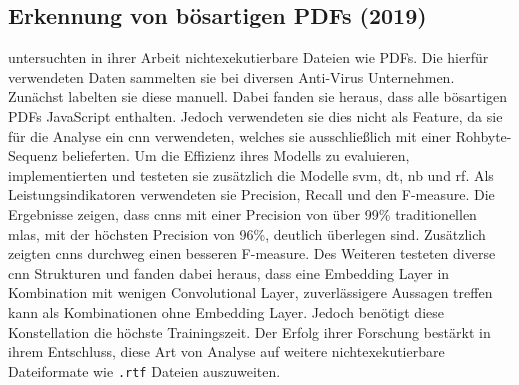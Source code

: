 \documentclass[
    12pt, %
    DIV10,
    ngerman, %
    a4paper, %
    oneside, %
    titlepage, %
    parskip=half, %
    headings=normal, %
    listof=totoc, %
    bibliography=totoc, %
    index=totoc, %
    captions=tableheading, %
    final %
]{scrreprt}
\begin{document}
\subsection{Erkennung von bösartigen PDFs (2019)}
\textcite{Jeong2019} untersuchten in ihrer Arbeit nichtexekutierbare Dateien wie PDFs. Die hierfür verwendeten Daten sammelten sie bei diversen Anti-Virus Unternehmen. Zunächst labelten sie diese manuell. Dabei fanden sie heraus, dass alle bösartigen PDFs JavaScript enthalten. Jedoch verwendeten sie dies nicht als Feature, da sie für die Analyse ein \ac{cnn} verwendeten, welches sie ausschlie{\ss}lich mit einer Rohbyte-Sequenz belieferten. Um die Effizienz ihres Modells zu evaluieren, implementierten und testeten sie zusätzlich die Modelle \ac{svm}, \ac{dt}, \acl{nb} und \ac{rf}. Als Leistungsindikatoren verwendeten sie Precision, Recall und den F-measure. Die Ergebnisse zeigen, dass \ac{cnns} mit einer Precision von über 99\% traditionellen \ac{mlas}, mit der höchsten Precision von 96\%, deutlich überlegen sind. Zusätzlich zeigten \ac{cnns} durchweg einen besseren F-measure. Des Weiteren testeten \citeauthor{Jeong2019} diverse \ac{cnn} Strukturen und fanden dabei heraus, dass eine Embedding Layer in Kombination mit wenigen Convolutional Layer, zuverlässigere Aussagen treffen kann als Kombinationen ohne Embedding Layer. Jedoch benötigt diese Konstellation die höchste Trainingszeit. Der Erfolg ihrer Forschung bestärkt \citeauthor{Jeong2019} in ihrem Entschluss, diese Art von Analyse auf weitere nichtexekutierbare Dateiformate wie \texttt{.rtf} Dateien auszuweiten.
\newpage
\end{document}
